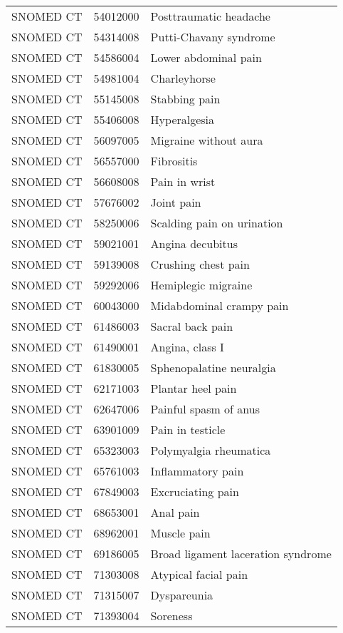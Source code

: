 \begin{longtable}{p{}p{}p{}}
  SNOMED CT & 54012000 & Posttraumatic headache \\ 
  SNOMED CT & 54314008 & Putti-Chavany syndrome \\ 
  SNOMED CT & 54586004 & Lower abdominal pain \\ 
  SNOMED CT & 54981004 & Charleyhorse \\ 
  SNOMED CT & 55145008 & Stabbing pain \\ 
  SNOMED CT & 55406008 & Hyperalgesia \\ 
  SNOMED CT & 56097005 & Migraine without aura \\ 
  SNOMED CT & 56557000 & Fibrositis \\ 
  SNOMED CT & 56608008 & Pain in wrist \\ 
  SNOMED CT & 57676002 & Joint pain \\ 
  SNOMED CT & 58250006 & Scalding pain on urination \\ 
  SNOMED CT & 59021001 & Angina decubitus \\ 
  SNOMED CT & 59139008 & Crushing chest pain \\ 
  SNOMED CT & 59292006 & Hemiplegic migraine \\ 
  SNOMED CT & 60043000 & Midabdominal crampy pain \\ 
  SNOMED CT & 61486003 & Sacral back pain \\ 
  SNOMED CT & 61490001 & Angina, class I \\ 
  SNOMED CT & 61830005 & Sphenopalatine neuralgia \\ 
  SNOMED CT & 62171003 & Plantar heel pain \\ 
  SNOMED CT & 62647006 & Painful spasm of anus \\ 
  SNOMED CT & 63901009 & Pain in testicle \\ 
  SNOMED CT & 65323003 & Polymyalgia rheumatica \\ 
  SNOMED CT & 65761003 & Inflammatory pain \\ 
  SNOMED CT & 67849003 & Excruciating pain \\ 
  SNOMED CT & 68653001 & Anal pain \\ 
  SNOMED CT & 68962001 & Muscle pain \\ 
  SNOMED CT & 69186005 & Broad ligament laceration syndrome \\ 
  SNOMED CT & 71303008 & Atypical facial pain \\ 
  SNOMED CT & 71315007 & Dyspareunia \\ 
  SNOMED CT & 71393004 & Soreness \\ 

\end{longtable}

